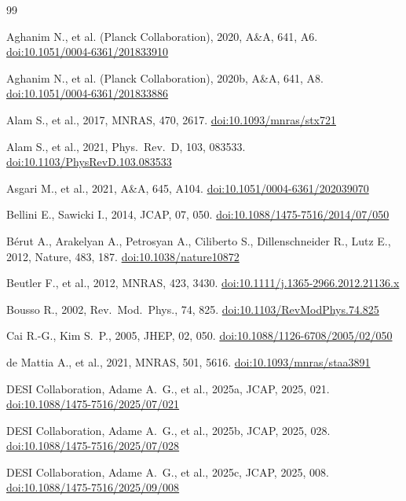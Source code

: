 \documentclass[12pt,a4paper]{article}
\newcommand{\doi}[1]{\href{https://doi.org/#1}{doi:#1}}
\begin{document}
\begin{thebibliography}{99}

Aghanim N., et al. ({Planck Collaboration}), 2020, A\&A, 641, A6.
\newblock \doi{10.1051/0004-6361/201833910}

Aghanim N., et al. ({Planck Collaboration}), 2020b, A\&A, 641, A8.
\newblock \doi{10.1051/0004-6361/201833886}

Alam S., et al., 2017, MNRAS, 470, 2617.
\newblock \doi{10.1093/mnras/stx721}

Alam S., et al., 2021, Phys.\ Rev.\ D, 103, 083533.
\newblock \doi{10.1103/PhysRevD.103.083533}

Asgari M., et al., 2021, A\&A, 645, A104.
\newblock \doi{10.1051/0004-6361/202039070}

Bellini E., Sawicki I., 2014, JCAP, 07, 050.
\newblock \doi{10.1088/1475-7516/2014/07/050}

B\'{e}rut A., Arakelyan A., Petrosyan A., Ciliberto S., Dillenschneider R.,
Lutz E., 2012, Nature, 483, 187.
\newblock \doi{10.1038/nature10872}

Beutler F., et al., 2012, MNRAS, 423, 3430.
\newblock \doi{10.1111/j.1365-2966.2012.21136.x}

Bousso R., 2002, Rev.\ Mod.\ Phys., 74, 825.
\newblock \doi{10.1103/RevModPhys.74.825}

Cai R.-G., Kim S.~P., 2005, JHEP, 02, 050.
\newblock \doi{10.1088/1126-6708/2005/02/050}

de Mattia A., et al., 2021, MNRAS, 501, 5616.
\newblock \doi{10.1093/mnras/staa3891}

{DESI Collaboration}, Adame A.~G., et al., 2025a, JCAP, 2025, 021.
\newblock \doi{10.1088/1475-7516/2025/07/021}

{DESI Collaboration}, Adame A.~G., et al., 2025b, JCAP, 2025, 028.
\newblock \doi{10.1088/1475-7516/2025/07/028}

{DESI Collaboration}, Adame A.~G., et al., 2025c, JCAP, 2025, 008.
\newblock \doi{10.1088/1475-7516/2025/09/008}


\end{thebibliography}
\end{document}
